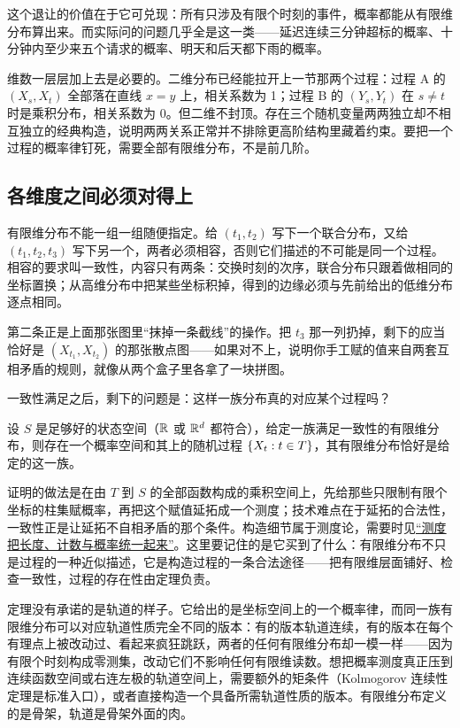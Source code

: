 这个退让的价值在于它可兑现：所有只涉及有限个时刻的事件，概率都能从有限维分布算出来。而实际问的问题几乎全是这一类——延迟连续三分钟超标的概率、十分钟内至少来五个请求的概率、明天和后天都下雨的概率。

维数一层层加上去是必要的。二维分布已经能拉开上一节那两个过程：过程 A 的 \((X_s,X_t)\) 全部落在直线 \(x=y\) 上，相关系数为 1；过程 B 的 \((Y_s,Y_t)\) 在 \(s\neq t\) 时是乘积分布，相关系数为 0。但二维不封顶。存在三个随机变量两两独立却不相互独立的经典构造，说明两两关系正常并不排除更高阶结构里藏着约束。要把一个过程的概率律钉死，需要全部有限维分布，不是前几阶。

\subsection{各维度之间必须对得上}

有限维分布不能一组一组随便指定。给 \((t_1,t_2)\) 写下一个联合分布，又给 \((t_1,t_2,t_3)\) 写下另一个，两者必须相容，否则它们描述的不可能是同一个过程。相容的要求叫一致性，内容只有两条：交换时刻的次序，联合分布只跟着做相同的坐标置换；从高维分布中把某些坐标积掉，得到的边缘必须与先前给出的低维分布逐点相同。

第二条正是上面那张图里``抹掉一条截线''的操作。把 \(t_3\) 那一列扔掉，剩下的应当恰好是 \((X_{t_1},X_{t_2})\) 的那张散点图——如果对不上，说明你手工赋的值来自两套互相矛盾的规则，就像从两个盒子里各拿了一块拼图。

一致性满足之后，剩下的问题是：这样一族分布真的对应某个过程吗？

\begin{theorem}
设 \(S\) 是足够好的状态空间（\(\mathbb{R}\) 或 \(\mathbb{R}^d\) 都符合），给定一族满足一致性的有限维分布，则存在一个概率空间和其上的随机过程 \(\left\{X_t : t\in T\right\}\)，其有限维分布恰好是给定的这一族。
\end{theorem}

证明的做法是在由 \(T\) 到 \(S\) 的全部函数构成的乘积空间上，先给那些只限制有限个坐标的柱集赋概率，再把这个赋值延拓成一个测度；技术难点在于延拓的合法性，一致性正是让延拓不自相矛盾的那个条件。构造细节属于测度论，需要时见\hyperref[sec:12-Real-Analysis-Support/05-Measure-Integration-and-Conditional-Expectation/02]{``测度把长度、计数与概率统一起来''}。这里要记住的是它买到了什么：有限维分布不只是过程的一种近似描述，它是构造过程的一条合法途径——把有限维层面铺好、检查一致性，过程的存在性由定理负责。

\begin{remark}
定理没有承诺的是轨道的样子。它给出的是坐标空间上的一个概率律，而同一族有限维分布可以对应轨道性质完全不同的版本：有的版本轨道连续，有的版本在每个有理点上被改动过、看起来疯狂跳跃，两者的任何有限维分布却一模一样——因为有限个时刻构成零测集，改动它们不影响任何有限维读数。想把概率测度真正压到连续函数空间或右连左极的轨道空间上，需要额外的矩条件（Kolmogorov 连续性定理是标准入口），或者直接构造一个具备所需轨道性质的版本。有限维分布定义的是骨架，轨道是骨架外面的肉。
\end{remark}

